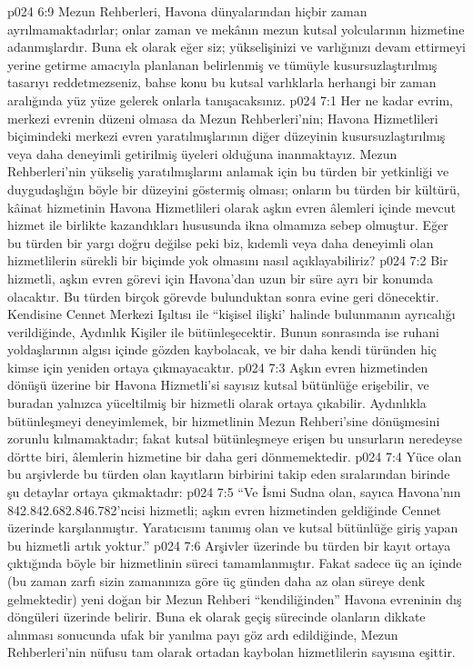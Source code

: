 \vs p024 6:9 Mezun Rehberleri, Havona dünyalarından hiçbir zaman ayrılmamaktadırlar; onlar zaman ve mekânın mezun kutsal yolcularının hizmetine adanmışlardır. Buna ek olarak eğer siz; yükselişinizi ve varlığınızı devam ettirmeyi yerine getirme amacıyla planlanan belirlenmiş ve tümüyle kusursuzlaştırılmış tasarıyı reddetmezseniz, bahse konu bu kutsal varlıklarla herhangi bir zaman aralığında yüz yüze gelerek onlarla tanışacaksınız.
\vs p024 7:1 Her ne kadar evrim, merkezi evrenin düzeni olmasa da Mezun Rehberleri’nin; Havona Hizmetlileri biçimindeki merkezi evren yaratılmışlarının diğer düzeyinin kusursuzlaştırılmış veya daha deneyimli getirilmiş üyeleri olduğuna inanmaktayız. Mezun Rehberleri’nin yükseliş yaratılmışlarını anlamak için bu türden bir yetkinliği ve duygudaşlığın böyle bir düzeyini göstermiş olması; onların bu türden bir kültürü, kâinat hizmetinin Havona Hizmetlileri olarak aşkın evren âlemleri içinde mevcut hizmet ile birlikte kazandıkları hususunda ikna olmamıza sebep olmuştur. Eğer bu türden bir yargı doğru değilse peki biz, kıdemli veya daha deneyimli olan hizmetlilerin sürekli bir biçimde yok olmasını nasıl açıklayabiliriz?
\vs p024 7:2 Bir hizmetli, aşkın evren görevi için Havona’dan uzun bir süre ayrı bir konumda olacaktır. Bu türden birçok görevde bulunduktan sonra evine geri dönecektir. Kendisine Cennet Merkezi Işıltısı ile “kişisel ilişki’ halinde bulunmanın ayrıcalığı verildiğinde, Aydınlık Kişiler ile bütünleşecektir. Bunun sonrasında ise ruhani yoldaşlarının algısı içinde gözden kaybolacak, ve bir daha kendi türünden hiç kimse için yeniden ortaya çıkmayacaktır.
\vs p024 7:3 Aşkın evren hizmetinden dönüşü üzerine bir Havona Hizmetli’si sayısız kutsal bütünlüğe erişebilir, ve buradan yalnızca yüceltilmiş bir hizmetli olarak ortaya çıkabilir. Aydınlıkla bütünleşmeyi deneyimlemek, bir hizmetlinin Mezun Rehberi’sine dönüşmesini zorunlu kılmamaktadır; fakat kutsal bütünleşmeye erişen bu unsurların neredeyse dörtte biri, âlemlerin hizmetine bir daha geri dönmemektedir.
\vs p024 7:4 Yüce olan bu arşivlerde bu türden olan kayıtların birbirini takip eden sıralarından birinde şu detaylar ortaya çıkmaktadır:
\vs p024 7:5 “Ve İsmi Sudna olan, sayıca Havona’nın 842.842.682.846.782’ncisi hizmetli; aşkın evren hizmetinden geldiğinde Cennet üzerinde karşılanmıştır. Yaratıcısını tanımış olan ve kutsal bütünlüğe giriş yapan bu hizmetli artık yoktur.”
\vs p024 7:6 Arşivler üzerinde bu türden bir kayıt ortaya çıktığında böyle bir hizmetlinin süreci tamamlanmıştır. Fakat sadece üç an içinde (bu zaman zarfı sizin zamanınıza göre üç günden daha az olan süreye denk gelmektedir) yeni doğan bir Mezun Rehberi “kendiliğinden” Havona evreninin dış döngüleri üzerinde belirir. Buna ek olarak geçiş sürecinde olanların dikkate alınması sonucunda ufak bir yanılma payı göz ardı edildiğinde, Mezun Rehberleri’nin nüfusu tam olarak ortadan kaybolan hizmetlilerin sayısına eşittir.
